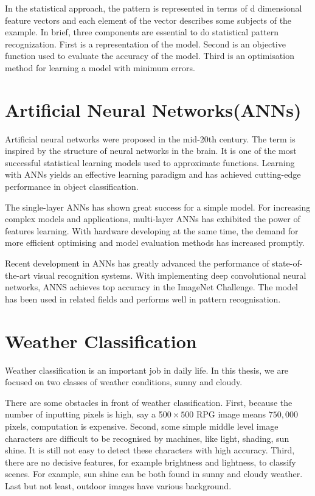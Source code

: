 In the statistical approach, the pattern is represented in terms of d dimensional feature vectors and each element of the vector describes some subjects of the example. In brief, three components are essential to do statistical pattern recognization. First is a representation of the model. Second is an objective function used to evaluate the accuracy of the model. Third is an optimisation method for learning a model with minimum errors.

\section{Artificial Neural Networks(ANNs)}

Artificial neural networks were proposed in the mid-20th century. The term is inspired by the structure of neural networks in the brain. It is one of the most successful statistical learning models used to approximate functions. Learning with ANNs yields an effective learning paradigm and has achieved cutting-edge performance in object classification. 

The single-layer ANNs  has shown great success for a simple model. For increasing complex models and applications, multi-layer ANNs has exhibited the power of features learning. With hardware developing at the same time, the demand for more efficient optimising and model evaluation methods has increased promptly. 

Recent development in ANNs has greatly advanced the performance of state-of-the-art visual recognition systems. With implementing deep convolutional neural networks, ANNS achieves top accuracy in the ImageNet Challenge. The model has been used in related fields and performs well in pattern recognisation.

\section{Weather Classification}

Weather classification is an important job in daily life. In this thesis, we are focused on two classes of weather conditions, sunny and cloudy. 

There are some obstacles in front of weather classification. First, because the number of inputting pixels is high, say a 5$00 \times 500$ RPG image means $750,000$ pixels, computation is expensive. Second, some simple middle level image characters are difficult to be recognised by machines, like light, shading, sun shine. It is still not easy to detect these characters with high accuracy.  Third, there are no decisive features, for example brightness and lightness, to classify scenes. For example, sun shine can be both found in sunny and cloudy weather. Last but not least, outdoor images have various background.


